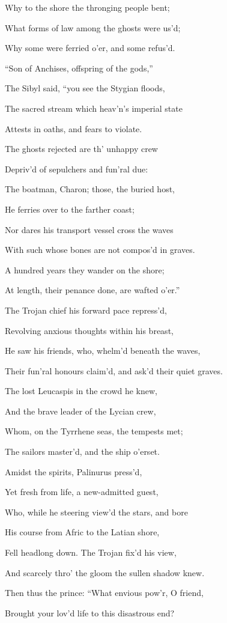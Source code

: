 Why to the shore the thronging people bent;

What forms of law among the ghosts were us’d;

Why some were ferried o’er, and some refus’d.

“Son of Anchises, offspring of the gods,”

The Sibyl said, “you see the Stygian floods,

The sacred stream which heav’n’s imperial state

Attests in oaths, and fears to violate.

The ghosts rejected are th’ unhappy crew

Depriv’d of sepulchers and fun’ral due:

The boatman, Charon; those, the buried host,

He ferries over to the farther coast;

Nor dares his transport vessel cross the waves

With such whose bones are not compos’d in graves.

A hundred years they wander on the shore;

At length, their penance done, are wafted o’er.”

The Trojan chief his forward pace repress’d,

Revolving anxious thoughts within his breast,

He saw his friends, who, whelm’d beneath the waves,

Their fun’ral honours claim’d, and ask’d their quiet graves.

The lost Leucaspis in the crowd he knew,

And the brave leader of the Lycian crew,

Whom, on the Tyrrhene seas, the tempests met;

The sailors master’d, and the ship o’erset.

Amidst the spirits, Palinurus press’d,

Yet fresh from life, a new-admitted guest,

Who, while he steering view’d the stars, and bore

His course from Afric to the Latian shore,

Fell headlong down. The Trojan fix’d his view,

And scarcely thro’ the gloom the sullen shadow knew.

Then thus the prince: “What envious pow’r, O friend,

Brought your lov’d life to this disastrous end?

